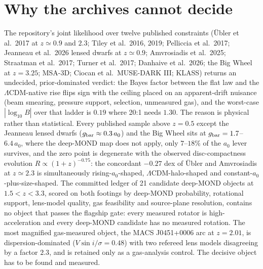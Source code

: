 \documentclass[11pt,letterpaper]{article}
\begin{document}
\section{Why the archives cannot decide}
The repository's joint likelihood over twelve published constraints (\"Ubler et al.\ 2017 at $z\simeq0.9$ and $2.3$; Tiley et al.\ 2016, 2019; Pelliccia et al.\ 2017; Jeanneau et al.\ 2026 lensed dwarfs at $z\simeq0.9$; Amvrosiadis et al.\ 2025; Straatman et al.\ 2017; Turner et al.\ 2017; Danhaive et al.\ 2026; the Big Wheel at $z=3.25$; MSA-3D; Ciocan et al.\ MUSE-DARK III; KLASS) returns an undecided, prior-dominated verdict: the Bayes factor between the flat law and the $\Lambda$CDM-native rise flips sign with the ceiling placed on an apparent-drift nuisance (beam smearing, pressure support, selection, unmeasured gas), and the worst-case $|\log_{10}B|$ over that ladder is $0.19$ where 20:1 needs $1.30$. The reason is physical rather than statistical. Every published sample above $z=0.5$ except the Jeanneau lensed dwarfs ($g_{\rm bar}\approx0.3\,a_0$) and the Big Wheel sits at $g_{\rm bar}=1.7$--$6.4\,a_0$, where the deep-MOND map does not apply, only $7$--$18\%$ of the $a_0$ lever survives, and the zero point is degenerate with the observed disc-compactness evolution $R\propto(1+z)^{-0.75}$: the concordant $-0.27$ dex of \"Ubler and Amvrosiadis at $z\simeq2.3$ is simultaneously rising-$a_0$-shaped, $\Lambda$CDM-halo-shaped and constant-$a_0$-plus-size-shaped. The committed ledger of 21 candidate deep-MOND objects at $1.5<z<3.3$, scored on both footings by deep-MOND probability, rotational support, lens-model quality, gas feasibility and source-plane resolution, contains no object that passes the flagship gate: every measured rotator is high-acceleration and every deep-MOND candidate has no measured rotation. The most magnified gas-measured object, the MACS J0451+0006 arc at $z=2.01$, is dispersion-dominated ($V\sin i/\sigma=0.48$) with two refereed lens models disagreeing by a factor $2.3$, and is retained only as a gas-analysis control. The decisive object has to be found and measured.
\end{document}
